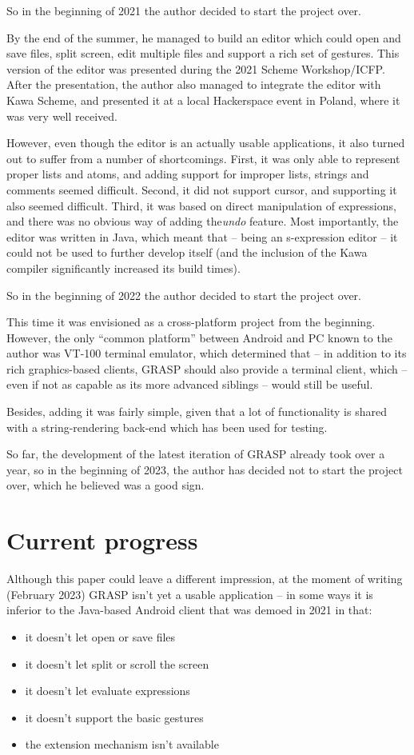 \documentclass[sigconf]{acmart}
\begin{document}
So in the beginning of 2021 the author decided
to start the project over.

By the end of the summer, he managed to build an editor
which could open and save files, split screen,
edit multiple files and support a rich set of gestures.
This version of the editor was presented during the 2021 Scheme
Workshop/ICFP. After the presentation, the author
also managed to integrate the editor with Kawa Scheme,
and presented it at a local Hackerspace event in Poland,
where it was very well received.

However, even though the editor is an actually usable
applications, it also turned out to suffer from a number
of shortcomings. First, it was only able to represent
proper lists and atoms, and adding support for improper lists,
strings and comments seemed difficult. Second, it did not support
cursor, and supporting it also seemed difficult.
Third, it was based on direct manipulation of expressions,
and there was no obvious way of adding the\textit{undo} feature.
Most importantly, the editor was written in Java,
which meant that -- being an s-expression editor -- it could
not be used to further develop itself (and the inclusion
of the Kawa compiler significantly increased its build times).

So in the beginning of 2022 the author decided
to start the project over.

This time it was envisioned as a cross-platform project
from the beginning. However, the only ``common platform''
between Android and PC known to the author was VT-100
terminal emulator, which determined that -- in addition
to its rich graphics-based clients, GRASP should also provide
a terminal client, which -- even if not as capable
as its more advanced siblings -- would still be useful.

Besides, adding it was fairly simple, given that a lot of
functionality is shared with a string-rendering back-end
which has been used for testing.

So far, the development of the latest iteration of GRASP
already took over a year, so in the beginning of 2023,
the author has decided not to start the project over,
which he believed was a good sign.

\section{Current progress}

Although this paper could leave a different impression,
at the moment of writing (February 2023) GRASP isn't yet 
a usable application -- in some ways it is inferior to the
Java-based Android client that was demoed in 2021
in that:
\begin{itemize}
\item it doesn't let open or save files
\item it doesn't let split or scroll the screen
\item it doesn't let evaluate expressions
\item it doesn't support the basic gestures
\item the extension mechanism isn't available
\end{itemize}
\end{document}
